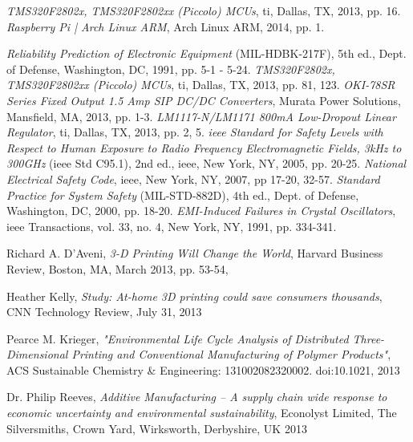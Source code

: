 \begin{thebibliography}{9}
	\textit{TMS320F2802x, TMS320F2802xx (Piccolo) MCUs},
	\gls{ti}, Dallas, TX,
	2013, pp. 16.
	\textit{Raspberry Pi | Arch Linux ARM},
	Arch Linux ARM,
	2014, pp. 1.

	\textit{Reliability Prediction of Electronic Equipment} (MIL-HDBK-217F), 5th ed.,
	Dept. of Defense, Washington, DC,
	1991, pp. 5-1 - 5-24.
	\textit{TMS320F2802x, TMS320F2802xx (Piccolo) MCUs},
	\gls{ti}, Dallas, TX,
	2013, pp. 81, 123.
	\textit{OKI-78SR Series Fixed Output 1.5 Amp SIP DC/DC Converters},
	Murata Power Solutions, Mansfield, MA,
	2013, pp. 1-3.
	\textit{LM1117-N/LM1171 800mA Low-Dropout Linear Regulator},
	\gls{ti}, Dallas, TX,
	2013, pp. 2, 5.
	\textit{\gls{ieee} Standard for Safety Levels with Respect to Human Exposure to Radio Frequency Electromagnetic Fields, 3kHz to 300GHz} (\gls{ieee} Std C95.1), 2nd ed.,
	\gls{ieee}, New York, NY,
	2005, pp. 20-25.
	\textit{National Electrical Safety Code},
	\gls{ieee}, New York, NY,
	2007, pp 17-20, 32-57.
	\textit{Standard Practice for System Safety} (MIL-STD-882D), 4th ed.,
	Dept. of Defense, Washington, DC,
	2000, pp. 18-20.
	\textit{EMI-Induced Failures in Crystal Oscillators},
	\gls{ieee} Transactions, vol. 33, no. 4, New York, NY,
	1991, pp. 334-341.
	
	Richard A. D'Aveni,
	\textit{3-D Printing Will Change the World},
	Harvard Business Review, Boston, MA,
	March 2013, pp. 53-54,
	
	Heather Kelly,
	\textit{Study: At-home 3D printing could save consumers thousands},
	CNN Technology Review,
	July 31, 2013
	
	Pearce M. Krieger,
	\textit{"Environmental Life Cycle Analysis of Distributed Three-Dimensional Printing and Conventional Manufacturing of Polymer Products"},
	ACS Sustainable Chemistry \& Engineering: 131002082320002. doi:10.1021,
	2013

	Dr. Philip Reeves,
	\textit{Additive Manufacturing – A supply chain wide response to economic uncertainty and environmental sustainability},
	Econolyst Limited, The Silversmiths, Crown Yard, Wirksworth, Derbyshire, UK
	2013
	
\end{thebibliography}